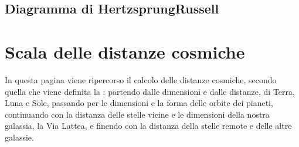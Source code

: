 \documentclass[letterpaper,10pt,italian]{jupyterBook}
\begin{document}
\subsection{Diagramma di Hertzsprung\sphinxhyphen{}Russell}
\label{\detokenize{ch/modern/astronomy-star-classification:diagramma-di-hertzsprung-russell}}
\sphinxstepscope


\section{Scala delle distanze cosmiche}
\label{\detokenize{ch/modern/astronomy-distance-ladder:scala-delle-distanze-cosmiche}}\label{\detokenize{ch/modern/astronomy-distance-ladder:physics-hs-modern-astronomy-distance-ladder}}\label{\detokenize{ch/modern/astronomy-distance-ladder::doc}}
\sphinxAtStartPar
In questa pagina viene ripercorso il calcolo delle distanze cosmiche, secondo quella che viene definita la : partendo dalle dimensioni e dalle distanze, di Terra, Luna e Sole, passando per le dimensioni e la forma delle orbite dei pianeti, continuando con la distanza delle stelle vicine e le dimensioni della nostra galassia, la Via Lattea, e finendo con la distanza della stelle remote e delle altre galassie.
\end{document}

